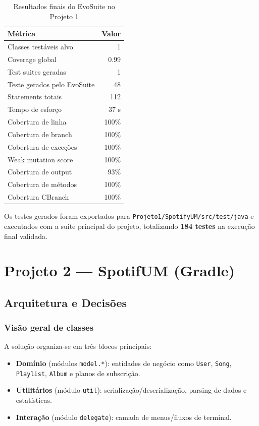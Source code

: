\documentclass{article}
\begin{document}
\begin{table}[H]
\centering
\begin{tabular}{lr}
\toprule
Métrica & Valor \\
\midrule
Classes testáveis alvo & 1 \\
Coverage global & 0.99 \\
Test suites geradas & 1 \\
Teste gerados pelo EvoSuite & 48 \\
Statements totais & 112 \\
Tempo de esforço & 37 s \\
Cobertura de linha & 100\% \\
Cobertura de branch & 100\% \\
Cobertura de exceções & 100\% \\
Weak mutation score & 100\% \\
Cobertura de output & 93\% \\
Cobertura de métodos & 100\% \\
Cobertura CBranch & 100\% \\
\bottomrule
\end{tabular}
\caption{Resultados finais do EvoSuite no Projeto 1}
\end{table}

\noindent Os testes gerados foram exportados para \texttt{Projeto1/SpotifyUM/src/test/java} e executados com a suite principal do projeto, totalizando \textbf{184 testes} na execução final validada.

\section{Projeto 2 — SpotifUM (Gradle)}
\subsection{Arquitetura e Decisões}
\subsubsection{Visão geral de classes}
A solução organiza-se em três blocos principais:
\begin{itemize}
    \item \textbf{Domínio} (módulos \texttt{model.*}): entidades de negócio como \texttt{User}, \texttt{Song}, \texttt{Playlist}, \texttt{Album} e planos de subscrição.
    \item \textbf{Utilitários} (módulo \texttt{util}): serialização/deserialização, parsing de dados e estatísticas.
    \item \textbf{Interação} (módulo \texttt{delegate}): camada de menus/fluxos de terminal.
\end{itemize}
\end{document}
